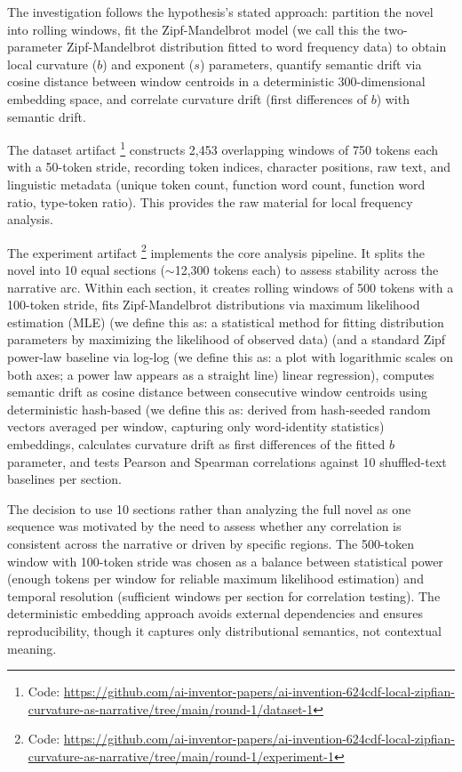 \documentclass[11pt,letterpaper]{article}
\begin{document}
The investigation follows the hypothesis's stated approach: partition the novel into rolling windows, fit the Zipf-Mandelbrot model (we call this the two-parameter Zipf-Mandelbrot distribution fitted to word frequency data) to obtain local curvature ($b$) and exponent ($s$) parameters, quantify semantic drift via cosine distance between window centroids in a deterministic 300-dimensional embedding space, and correlate curvature drift (first differences of $b$) with semantic drift.

The dataset artifact \footnote{Code: \url{https://github.com/ai-inventor-papers/ai-invention-624cdf-local-zipfian-curvature-as-narrative/tree/main/round-1/dataset-1}} constructs 2,453 overlapping windows of 750 tokens each with a 50-token stride, recording token indices, character positions, raw text, and linguistic metadata (unique token count, function word count, function word ratio, type-token ratio). This provides the raw material for local frequency analysis.

The experiment artifact \footnote{Code: \url{https://github.com/ai-inventor-papers/ai-invention-624cdf-local-zipfian-curvature-as-narrative/tree/main/round-1/experiment-1}} implements the core analysis pipeline. It splits the novel into 10 equal sections ($\sim$12,300 tokens each) to assess stability across the narrative arc. Within each section, it creates rolling windows of 500 tokens with a 100-token stride, fits Zipf-Mandelbrot distributions via maximum likelihood estimation (MLE) (we define this as: a statistical method for fitting distribution parameters by maximizing the likelihood of observed data) (and a standard Zipf power-law baseline via log-log (we define this as: a plot with logarithmic scales on both axes; a power law appears as a straight line) linear regression), computes semantic drift as cosine distance between consecutive window centroids using deterministic hash-based (we define this as: derived from hash-seeded random vectors averaged per window, capturing only word-identity statistics) embeddings, calculates curvature drift as first differences of the fitted $b$ parameter, and tests Pearson and Spearman correlations against 10 shuffled-text baselines per section.

The decision to use 10 sections rather than analyzing the full novel as one sequence was motivated by the need to assess whether any correlation is consistent across the narrative or driven by specific regions. The 500-token window with 100-token stride was chosen as a balance between statistical power (enough tokens per window for reliable maximum likelihood estimation) and temporal resolution (sufficient windows per section for correlation testing). The deterministic embedding approach avoids external dependencies and ensures reproducibility, though it captures only distributional semantics, not contextual meaning.
\end{document}
